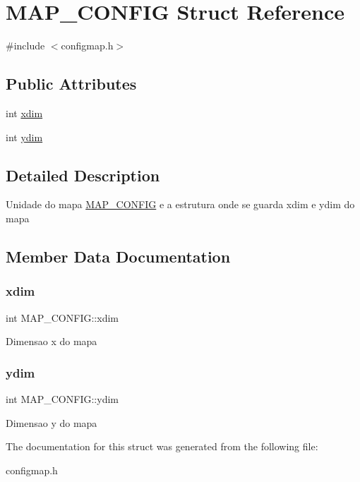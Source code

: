 \hypertarget{struct_m_a_p___c_o_n_f_i_g}{}\section{M\+A\+P\+\_\+\+C\+O\+N\+F\+IG Struct Reference}
\label{struct_m_a_p___c_o_n_f_i_g}


{\ttfamily \#include $<$configmap.\+h$>$}

\subsection*{Public Attributes}
\begin{DoxyCompactItemize}
\item 
int \mbox{\hyperlink{struct_m_a_p___c_o_n_f_i_g_ade8a779165793714b9b147dc357afc4c}{xdim}}
\item 
int \mbox{\hyperlink{struct_m_a_p___c_o_n_f_i_g_a5da3acf63cab314c37da2568328fdc8f}{ydim}}
\end{DoxyCompactItemize}


\subsection{Detailed Description}
Unidade do mapa \mbox{\hyperlink{struct_m_a_p___c_o_n_f_i_g}{M\+A\+P\+\_\+\+C\+O\+N\+F\+IG}} e a estrutura onde se guarda xdim e ydim do mapa 

\subsection{Member Data Documentation}
\mbox{\label{struct_m_a_p___c_o_n_f_i_g_ade8a779165793714b9b147dc357afc4c}} 
\subsubsection{\texorpdfstring{xdim}{xdim}}
{\footnotesize\ttfamily int M\+A\+P\+\_\+\+C\+O\+N\+F\+I\+G\+::xdim}

Dimensao x do mapa \mbox{\label{struct_m_a_p___c_o_n_f_i_g_a5da3acf63cab314c37da2568328fdc8f}} 
\subsubsection{\texorpdfstring{ydim}{ydim}}
{\footnotesize\ttfamily int M\+A\+P\+\_\+\+C\+O\+N\+F\+I\+G\+::ydim}

Dimensao y do mapa 

The documentation for this struct was generated from the following file\+:\begin{DoxyCompactItemize}
\item 
configmap.\+h\end{DoxyCompactItemize}

